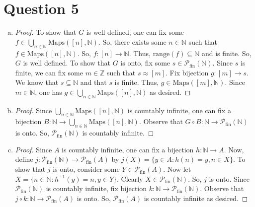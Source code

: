 \documentclass{article}
\begin{document}
\section*{Question 5}
\begin{enumerate}[(a)]
    \item 
    \begin{proof}
        To show that $G$ is well defined, one can fix some $f\in\bigcup_{n\in\mathbb{N}}\text{Maps}([n],\mathbb{N})$. So, there exists some $n\in\mathbb{N}$ such that $f\in\text{Maps}([n],\mathbb{N})$. So, $f:[n]\rightarrow\mathbb{N}$. Thus, $\text{range}(f)\subseteq\mathbb{N}$ and is finite. So, $G$ is well defined. To show that $G$ is onto, fix some $s\in\mathcal{P}_\text{fin}(\mathbb{N})$. Since $s$ is finite, we can fix some $m\in\mathbb{Z}$ such that $s\approx[m]$. Fix bijection $g:[m]\rightarrow{s}$. We know that $s\subseteq\mathbb{N}$ and that $s$ is finite. Thus, $g\in\text{Maps}([m],\mathbb{N})$. Since $m\in\mathbb{N}$, one has $g\in\bigcup_{n\in\mathbb{N}}\text{Maps}([n],\mathbb{N})$ as desired.
    \end{proof}
    \item 
    \begin{proof}
        Since $\bigcup_{n\in\mathbb{N}}\text{Maps}([n],\mathbb{N})$ is countably infinite, one can fix a bijection $B:\mathbb{N}\rightarrow\bigcup_{n\in\mathbb{N}}\text{Maps}([n],\mathbb{N})$. Observe that $G\circ{B}:\mathbb{N}\rightarrow\mathcal{P}_\text{fin}(\mathbb{N})$ is onto. So, $\mathcal{P}_\text{fin}(\mathbb{N})$ is countably infinite.
    \end{proof}
    \item
    \begin{proof}
        Since $A$ is countably infinite, one can fix a bijection $h:\mathbb{N}\rightarrow{A}$. Now, define $j:\mathcal{P}_\text{fin}(\mathbb{N})\rightarrow\mathcal{P}_\text{fin}(A)$ by $j(X)=\{y\in{A}:h(n)=y,n\in{X}\}$. To show that $j$ is onto, consider some $Y\in\mathcal{P}_\text{fin}(A)$. Now let $X=\{n\in\mathbb{N}:h^{-1}(y)=n,y\in{Y}\}$. Clearly $X\in\mathcal{P}_\text{fin}(\mathbb{N})$. So, $j$ is onto. Since $\mathcal{P}_\text{fin}(\mathbb{N})$ is countably infinite, fix bijection $k:\mathbb{N}\rightarrow\mathcal{P}_\text{fin}(\mathbb{N})$. Observe that $j\circ{k}:\mathbb{N}\rightarrow\mathcal{P}_\text{fin}(A)$ is onto. So, $\mathcal{P}_\text{fin}(A)$ is countably infinite as desired.
    \end{proof}
\end{enumerate}
\end{document}
